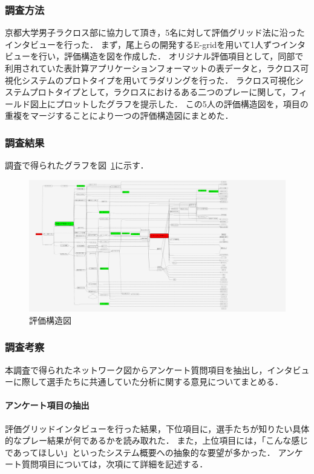\documentclass[sotsuron]{kuee}
\begin{document}
			\subsubsection{調査方法}
				京都大学男子ラクロス部に協力して頂き，5名に対して評価グリッド法に沿ったインタビューを行った． 
				まず，尾上らの開発するE-gridを用いて1人ずつインタビューを行い，評価構造を図を作成した． 
				オリジナル評価項目として，同部で利用されていた表計算アプリケーションフォーマットの表データと，ラクロス可視化システムのプロトタイプを用いてラダリングを行った． 
				ラクロス可視化システムプロトタイプとして，ラクロスにおけるある二つのプレーに関して，フィールド図上にプロットしたグラフを提示した． 
				この5人の評価構造図を，項目の重複をマージすることにより一つの評価構造図にまとめた．
			\subsubsection{調査結果}	
				調査で得られたグラフを図~\ref{fig:egrid}に示す．
					\begin{figure}
						\begin{center}
							\includegraphics[width=\linewidth,angle=90]{./png/egrid.png}
						\end{center}
						\caption{評価構造図}
				  		\label{fig:egrid}
					\end{figure}
			\subsubsection{調査考察}
				本調査で得られたネットワーク図からアンケート質問項目を抽出し，インタビューに際して選手たちに共通していた分析に関する意見についてまとめる．
				\paragraph{アンケート項目の抽出}
					評価グリッドインタビューを行った結果，下位項目に，選手たちが知りたい具体的なプレー結果が何であるかを読み取れた．
					また，上位項目には，「こんな感じであってほしい」といったシステム概要への抽象的な要望が多かった．
					アンケート質問項目については，次項にて詳細を記述する．
\end{document}
